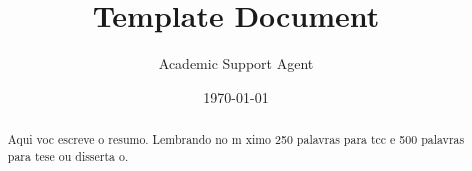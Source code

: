\documentclass{article}
\title{Template Document}
\author{Academic Support Agent}
\date{\today}
\begin{document}
\maketitle

\maketitle

\restoregeometry

	
\makeapprove




\begin{abstract}
		
Aqui voc  escreve o resumo. Lembrando no m ximo 250 palavras para tcc e 500 palavras para tese ou disserta o.

\end{abstract}
\end{document}
